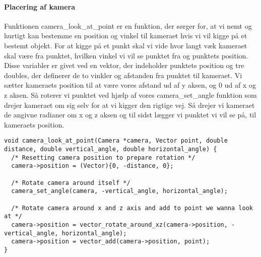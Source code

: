 \paragraph{Placering af kamera}

Funktionen camera\_look\_at\_point er en funktion, der sørger for, at vi nemt og hurtigt kan bestemme en position og vinkel til kameraet hvis vi vil kigge på et bestemt objekt. 
For at kigge på et punkt skal vi vide hvor langt væk kameraet skal være fra punktet, hvilken vinkel vi vil se punktet fra og punktets position. Disse variabler er givet ved en vektor, der indeholder punktets position og tre doubles, der definerer de to vinkler og afstanden fra punktet til kameraet.
Vi sætter kameraets position til at være vores afstand ud af y aksen, og 0 ud af x og z aksen. Så roterer vi punktet ved hjælp af vores camera\_set\_angle funktion som drejer kameraet om sig selv for at vi kigger den rigtige vej.
Så drejer vi kameraet de angivne radianer om x og z aksen og til sidst lægger vi punktet vi vil se på, til kameraets position.

\begin{lstlisting}[style=Cstyle, caption=Kode-uddrag fra camera.c: camera\_look\_at\_point]
void camera_look_at_point(Camera *camera, Vector point, double distance, double vertical_angle, double horizontal_angle) {
  /* Resetting camera position to prepare rotation */
  camera->position = (Vector){0, -distance, 0};

  /* Rotate camera around itself */
  camera_set_angle(camera, -vertical_angle, horizontal_angle);
  
  /* Rotate camera around x and z axis and add to point we wanna look at */
  camera->position = vector_rotate_around_xz(camera->position, -vertical_angle, horizontal_angle);
  camera->position = vector_add(camera->position, point);
}
\end{lstlisting}